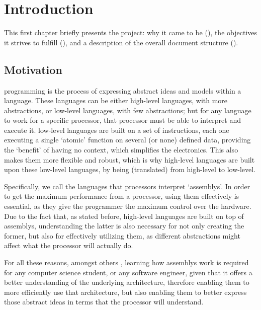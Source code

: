 \chapter{Introduction}\label{chap:introduction}
This first chapter briefly presents the project: why it came to be (), the objectives it strives to fulfill (), and a description of the overall document structure ().


\section{Motivation}\label{sec:motivation}
\Gls{programming} is the process of expressing abstract ideas and models within a language. These languages can be either \glspl{high-level language}, with more abstractions, or \glspl{low-level language}, with few abstractions; but for any language to work for a specific \gls{processor}, that \gls{processor} must be able to interpret and execute it. \Glspl{low-level language} are built on a set of instructions, each one executing a single `atomic' function on several (or none) defined data, providing the `benefit' of having no context, which simplifies the electronics. This also makes them more flexible and robust, which is why \glspl{high-level language} are built upon these \glspl{low-level language}, by being  (translated) from high-level to low-level.

Specifically, we call  the languages that processors interpret `\glspl{assembly}'. In order to get the maximum performance from a \gls{processor}, using them effectively is essential, as they give the \gls{programmer} the maximum control over the hardware. Due to the fact that, as stated before, \glspl{high-level language} are built on top of \glspl{assembly}, understanding the latter is also necessary for not only creating the former, but also for effectively utilizing them, as different abstractions might affect what the \gls{processor} will actually do.

For all these reasons, amongst others \supercite{jorgensen2019x86}, learning how \glspl{assembly} work is required for any \gls{computer science} student, or any \gls{software engineer}, given that it offers a better understanding of the underlying architecture, therefore enabling them to more efficiently use that architecture, but also enabling them to better express those abstract ideas in terms that the \gls{processor} will understand.


